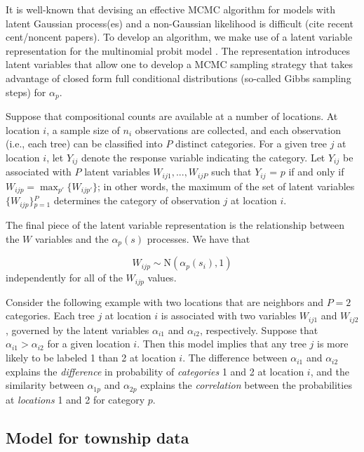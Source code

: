 \documentclass[12pt]{article}\usepackage[]{graphicx}\usepackage[]{color}
\begin{document}
It is well-known that devising an effective MCMC algorithm for models
with latent Gaussian process(es) and a non-Gaussian likelihood is
difficult (cite recent cent/noncent papers). To develop an algorithm,
we make use of a latent variable representation for the multinomial
probit model \citep{McCu:Ross:1994}. The representation introduces
latent variables that allow one to develop a MCMC sampling strategy
that takes advantage of closed form full conditional distributions
(so-called Gibbs sampling steps) for $\alpha_{p}$.

Suppose that compositional counts are available at a number of locations.
At location $i$, a sample size of $n_{i}$ observations are collected,
and each observation (i.e., each tree) can be classified into $P$
distinct categories. For a given tree $j$ at location $i$, let $Y_{ij}$
denote the response variable indicating the category. Let $Y_{ij}$
be associated with $P$ latent variables $W_{ij1},...,W_{ijP}$ such
that $Y_{ij}$ = $p$ if and only if $W_{ijp}={\displaystyle \max_{p'}\big\{ W_{ijp'}\big\}}$;
in other words, the maximum of the set of latent variables $\{W_{ijp}\}{\displaystyle _{p=1}^{P}}$
determines the category of observation $j$ at location $i$. 



\noindent The final piece of the latent variable representation is
the relationship between the $W$ variables and the $\alpha_{p}(s)$
processes. We have that

\noindent 
\[
W_{ijp}\sim\mbox{N}(\alpha_{p}(s_{i}),1)
\]
independently for all of the $W_{ijp}$ values. 

\noindent Consider the following example with two locations that are
neighbors and $P=2$ categories. Each tree $j$ at location $i$ is
associated with two variables $W_{ij1}$ and $W_{ij2}$, governed
by the latent variables $\alpha_{i1}$ and $\alpha_{i2}$, respectively.
Suppose that $\alpha_{i1}>\alpha_{i2}$ for a given location $i$.
Then this model implies that any tree $j$ is more likely to be labeled
1 than 2 at location $i$. The difference between $\alpha_{i1}$ and
$\alpha_{i2}$ explains the \textit{difference} in probability of
\textit{categories} 1 and 2 at location $i$, and the similarity between
$\alpha_{1p}$ and $\alpha_{2p}$ explains the \textit{correlation}
between the probabilities at \textit{locations} 1 and 2 for category
$p$.


\subsection{Model for township data\label{sub:Model-for-township}}
\end{document}
